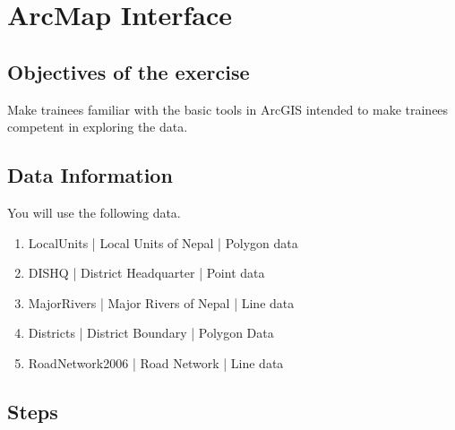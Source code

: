\chapter{ArcMap Interface}
\section{Objectives of the exercise}
Make trainees familiar with the basic tools in ArcGIS intended to make trainees competent in exploring the data.

\section{Data Information}
You will use the following data.
\begin{enumerate}
\item{LocalUnits | Local Units of Nepal | Polygon data}
\item{DIS\textunderscore HQ | District Headquarter | Point data}
\item{MajorRivers | Major Rivers of Nepal | Line data}
\item{Districts | District Boundary | Polygon Data}
\item{RoadNetwork2006 | Road Network | Line data}
\end{enumerate}

\section{Steps}
